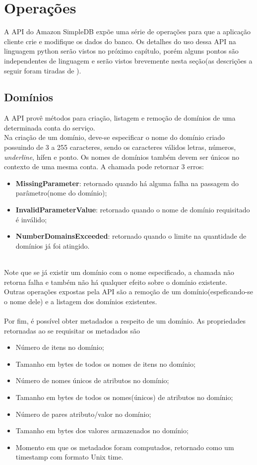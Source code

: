\section{Operações}
A API do Amazon SimpleDB expõe uma série de operações para que a aplicação cliente crie e modifique os dados do banco. Os detalhes do uso dessa API na linguagem python serão vistos no próximo capítulo, porém alguns pontos são independentes de linguagem e serão vistos brevemente nesta seção(as descrições a seguir foram tiradas de \cite{habeeb2011}).

\subsection{Domínios}
A API provê métodos para criação, listagem e remoção de domínios de uma determinada conta do serviço.\\
Na criação de um domínio, deve-se especificar o nome do domínio criado possuindo de 3 a 255 caracteres, sendo os caracteres válidos letras, números, \textit{underline}, hífen e ponto. Os nomes de domínios também devem ser únicos no contexto de uma mesma conta. A chamada pode retornar 3 erros:
\\
\begin{itemize}
	\item \textbf{MissingParameter}: retornado quando há alguma falha na passagem do parâmetro(nome do domínio);
	\item \textbf{InvalidParameterValue}: retornado quando o nome de domínio requisitado é inválido;
	\item \textbf{NumberDomainsExceeded}: retornado quando o limite na quantidade de domínios já foi atingido.
\end{itemize}
\\
Note que se já existir um domínio com o nome especificado, a chamada não retorna falha e também não há qualquer efeito sobre o domínio existente.\\
Outras operações expostas pela API são a remoção de um domínio(espeficando-se o nome dele) e a listagem dos domínios existentes.\\\\
Por fim, é possível obter metadados a respeito de um domínio. As propriedades retornadas ao se requisitar os metadados são
\\
\begin{itemize}
	\item Número de itens no domínio;
	\item Tamanho em bytes de todos os nomes de itens no domínio;
	\item Número de nomes únicos de atributos no domínio;
	\item Tamanho em bytes de todos os nomes(únicos) de atributos no domínio;
	\item Número de pares atributo/valor no domínio;
	\item Tamanho em bytes dos valores armazenados no domínio;
	\item Momento em que os metadados foram computados, retornado como um timestamp com formato Unix time.
\end{itemize}
\\

